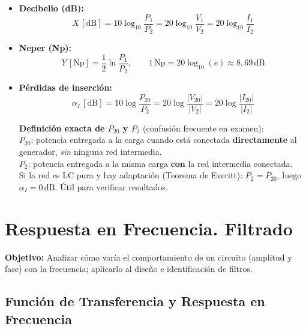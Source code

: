 \documentclass[12pt,a4paper]{article}
\begin{document}
\begin{itemize}[leftmargin=1.5em, itemsep=6pt]

  \item \textbf{Decibelio (dB):}
  \[
    X\,[\text{dB}] = 10\log_{10}\!\frac{P_1}{P_2}
    = 20\log_{10}\!\frac{V_1}{V_2} = 20\log_{10}\!\frac{I_1}{I_2}
  \]

  \item \textbf{Neper (Np):}
  \[
    Y\,[\text{Np}] = \frac{1}{2}\ln\frac{P_1}{P_2},
    \qquad 1\,\text{Np} = 20\log_{10}(e) \approx 8{,}69\,\text{dB}
  \]

  \item \textbf{Pérdidas de inserción:}
  \[
    \alpha_I\,[\text{dB}]
    = 10\log\frac{P_{20}}{P_2}
    = 20\log\frac{|V_{20}|}{|V_2|}
    = 20\log\frac{|I_{20}|}{|I_2|}
  \]

  \begin{warnbox}
  \textbf{\color{warnorangeline}Definición exacta de $P_{20}$ y $P_2$}
  (confusión frecuente en examen):\\[4pt]
  \quad $P_{20}$: potencia entregada a la carga cuando está conectada
  \textbf{directamente} al generador, \emph{sin} ninguna red intermedia.\\
  \quad $P_2$: potencia entregada a la misma carga \textbf{con} la red intermedia
  conectada.\\[4pt]
  Si la red es LC pura y hay adaptación (Teorema de Everitt): $P_2 = P_{20}$,
  luego $\alpha_I = 0\,\text{dB}$. Útil para verificar resultados.
  \end{warnbox}

\end{itemize}

\section{Respuesta en Frecuencia. Filtrado}

\textbf{Objetivo:} Analizar cómo varía el comportamiento de un circuito (amplitud
y fase) con la frecuencia; aplicarlo al diseño e identificación de filtros.

\subsection{Función de Transferencia y Respuesta en Frecuencia}
\end{document}
